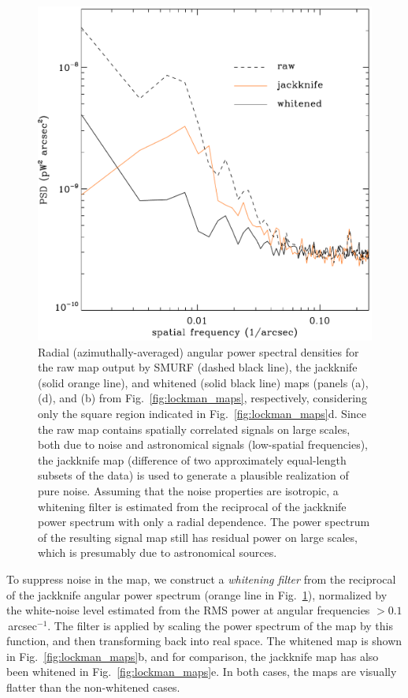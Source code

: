 \documentclass[useAMS,usenatbib,nofootinbib]{mn2e}
\begin{document}
\begin{figure}
\centering
\includegraphics[width=\linewidth]{lockman_pspec.pdf}
\caption{Radial (azimuthally-averaged) angular power spectral
  densities for the raw map output by SMURF (dashed black line), the
  jackknife (solid orange line), and whitened (solid black line) maps
  (panels (a), (d), and (b) from Fig.~\ref{fig:lockman_maps},
  respectively, considering only the square region indicated in
  Fig.~\ref{fig:lockman_maps}d. Since the raw map contains spatially
  correlated signals on large scales, both due to noise and
  astronomical signals (low-spatial frequencies), the jackknife map
  (difference of two approximately equal-length subsets of the data)
  is used to generate a plausible realization of pure noise. Assuming
  that the noise properties are isotropic, a whitening filter is
  estimated from the reciprocal of the jackknife power spectrum with
  only a radial dependence. The power spectrum of the resulting signal
  map still has residual power on large scales, which is presumably
  due to astronomical sources.}
\label{fig:lockman_pspec}
\end{figure}

To suppress noise in the map, we construct a \emph{whitening filter}
from the reciprocal of the jackknife angular power spectrum (orange
line in Fig.~\ref{fig:lockman_pspec}), normalized by the white-noise
level estimated from the RMS power at angular frequencies $>
0.1$\,arcsec$^{-1}$. The filter is applied by scaling the power
spectrum of the map by this function, and then transforming back into
real space. The whitened map is shown in Fig.~\ref{fig:lockman_maps}b,
and for comparison, the jackknife map has also been whitened in
Fig.~\ref{fig:lockman_maps}e. In both cases, the maps are visually
flatter than the non-whitened cases.
\end{document}
